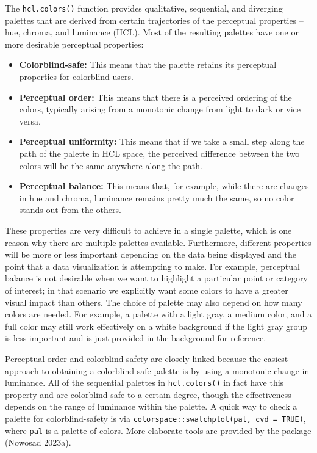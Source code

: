 The \texttt{hcl.colors()} function provides
qualitative, sequential, and diverging palettes that are derived from
certain trajectories of the perceptual properties -- hue, chroma, and luminance
(HCL). Most of the resulting palettes have one
or more desirable perceptual properties:

\begin{itemize}
\tightlist
\item
  \textbf{Colorblind-safe:} This means that the palette retains
  its perceptual properties for colorblind users.
\item
  \textbf{Perceptual order:} This means that there is a perceived ordering
  of the colors, typically arising from a monotonic change from
  light to dark or vice versa.
\item
  \textbf{Perceptual uniformity:} This means that if we take a small step along
  the path of the palette in HCL space, the perceived difference
  between the two colors will be the same anywhere along the path.
\item
  \textbf{Perceptual balance:} This means that, for example,
  while there are changes in hue and chroma, luminance remains
  pretty much the same, so no color stands out from the others.
\end{itemize}

These properties are very difficult to achieve in
a single palette, which is one reason why there are multiple palettes
available. Furthermore, different properties will be more or less
important depending on the data being displayed and the point that
a data visualization is attempting to make. For example, perceptual
balance is not desirable when we want to highlight a particular
point or category of interest; in that scenario we explicitly
want some colors to have a greater visual impact than others.
The choice of palette may also depend on how many colors are needed. For
example, a palette with a light gray, a medium color, and a full color may still
work effectively on a white background if the
light gray group is less important and
is just provided in the background for
reference.

Perceptual order and colorblind-safety are closely linked
because the easiest approach to obtaining
a colorblind-safe palette is by using a monotonic
change in luminance. All of the sequential palettes in \texttt{hcl.colors()} in
fact have this property and are colorblind-safe to a certain degree, though
the effectiveness
depends on the range of luminance within the palette.
A quick way to check a palette for colorblind-safety is via
\texttt{colorspace::swatchplot(pal,\ cvd\ =\ TRUE)}, where \texttt{pal} is a palette of colors.
More elaborate tools
are provided by the package  (Nowosad 2023a).

